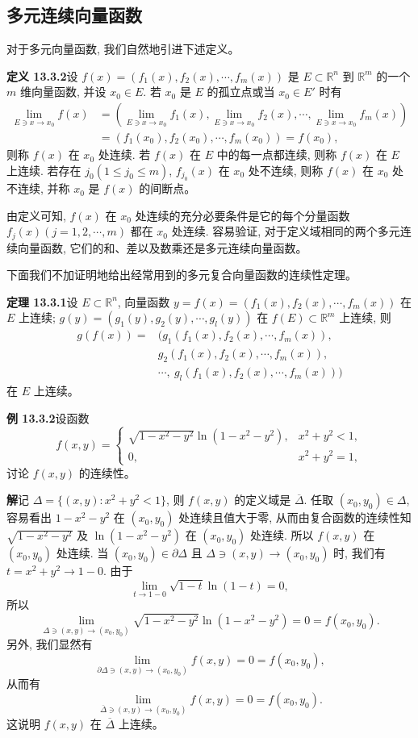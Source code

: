 \documentclass[UTF8, 12pt, fontset=fandol, oneside]{ctexart}
\begin{document}
\subsection{多元连续向量函数}

对于多元向量函数, 我们自然地引进下述定义。

\noindent\textbf{定义 13.3.2}\quad 设 $f(x)=(f_1(x),f_2(x),\cdots,f_m(x))$ 是 $E\subset\mathbb R^n$ 到 $\mathbb R^m$ 的一个 $m$ 维向量函数, 并设 $x_0\in E$. 若 $x_0$ 是 $E$ 的孤立点或当 $x_0\in E'$ 时有
\[
\begin{aligned}
  \lim_{E\ni x\to x_0}f(x)
  &=
  \left(\lim_{E\ni x\to x_0}f_1(x),
  \lim_{E\ni x\to x_0}f_2(x),
  \cdots,\lim_{E\ni x\to x_0}f_m(x)\right)\\
  &=(f_1(x_0),f_2(x_0),\cdots,f_m(x_0))=f(x_0),
\end{aligned}
\]
则称 $f(x)$ 在 $x_0$ 处连续. 若 $f(x)$ 在 $E$ 中的每一点都连续, 则称 $f(x)$ 在 $E$ 上连续. 若存在 $j_0(1\le j_0\le m)$, $f_{j_0}(x)$ 在 $x_0$ 处不连续, 则称 $f(x)$ 在 $x_0$ 处不连续, 并称 $x_0$ 是 $f(x)$ 的间断点。

由定义可知, $f(x)$ 在 $x_0$ 处连续的充分必要条件是它的每个分量函数 $f_j(x)(j=1,2,\cdots,m)$ 都在 $x_0$ 处连续. 容易验证, 对于定义域相同的两个多元连续向量函数, 它们的和、差以及数乘还是多元连续向量函数。

下面我们不加证明地给出经常用到的多元复合向量函数的连续性定理。

\noindent\textbf{定理 13.3.1}\quad 设 $E\subset\mathbb R^n$, 向量函数 $y=f(x)=(f_1(x),f_2(x),\cdots,f_m(x))$ 在 $E$ 上连续; $g(y)=(g_1(y),g_2(y),\cdots,g_l(y))$ 在 $f(E)\subset\mathbb R^m$ 上连续, 则
\[
\begin{aligned}
  g(f(x))={}&(g_1(f_1(x),f_2(x),\cdots,f_m(x)),\\
  &g_2(f_1(x),f_2(x),\cdots,f_m(x)),\\
  &\cdots,\ g_l(f_1(x),f_2(x),\cdots,f_m(x)))
\end{aligned}
\]
在 $E$ 上连续。

\noindent\textbf{例 13.3.2}\quad 设函数
\[
  f(x,y)=
  \begin{cases}
    \sqrt{1-x^2-y^2}\ln(1-x^2-y^2), & x^2+y^2<1,\\
    0, & x^2+y^2=1,
  \end{cases}
\]
讨论 $f(x,y)$ 的连续性。

\noindent\textbf{解}\quad 记 $\Delta=\{(x,y):x^2+y^2<1\}$, 则 $f(x,y)$ 的定义域是 $\overline\Delta$. 任取 $(x_0,y_0)\in\Delta$, 容易看出 $1-x^2-y^2$ 在 $(x_0,y_0)$ 处连续且值大于零, 从而由复合函数的连续性知 $\sqrt{1-x^2-y^2}$ 及 $\ln(1-x^2-y^2)$ 在 $(x_0,y_0)$ 处连续. 所以 $f(x,y)$ 在 $(x_0,y_0)$ 处连续. 当 $(x_0,y_0)\in\partial\Delta$ 且 $\Delta\ni(x,y)\to(x_0,y_0)$ 时, 我们有 $t=x^2+y^2\to1-0$. 由于
\[
  \lim_{t\to1-0}\sqrt{1-t}\ln(1-t)=0,
\]
所以
\[
  \lim_{\Delta\ni(x,y)\to(x_0,y_0)}
  \sqrt{1-x^2-y^2}\ln(1-x^2-y^2)=0=f(x_0,y_0).
\]
另外, 我们显然有
\[
  \lim_{\partial\Delta\ni(x,y)\to(x_0,y_0)}f(x,y)=0=f(x_0,y_0),
\]
从而有
\[
  \lim_{\overline\Delta\ni(x,y)\to(x_0,y_0)}f(x,y)=0=f(x_0,y_0).
\]
这说明 $f(x,y)$ 在 $\overline\Delta$ 上连续。
\end{document}
